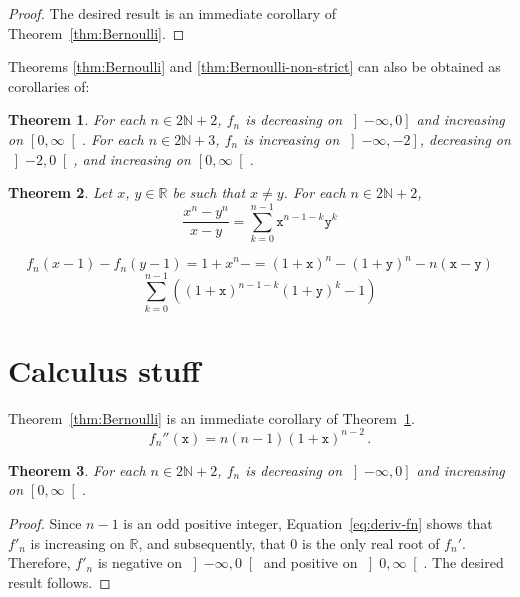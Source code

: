 \documentclass[12pt]{article}
\newcommand{\bR}{\mathbb{R}}
\newcommand{\bN}{\mathbb{N}}
\newcommand{\gtint}[1]{\left] #1, \infty \right[}
\newcommand{\geint}[1]{\left[ #1, \infty \right[}
\newcommand{\ltint}[1]{\left]- \infty, #1 \right[}
\newcommand{\leint}[1]{\left]- \infty, #1 \right]}
\newcommand{\ttx}{\mathtt{x}}
\newcommand{\tty}{\mathtt{y}}
\newtheorem{theorem}{Theorem}
\begin{document}
 \begin{proof}
   The desired result is an immediate corollary of Theorem~\ref{thm:Bernoulli}.
 \end{proof}

 Theorems \ref{thm:Bernoulli} and \ref{thm:Bernoulli-non-strict} can also be obtained as corollaries of:
 
  \begin{theorem} \label{thm:variation}
    For each $n \in 2 \bN + 2$,
    $f_n$ is
    decreasing on $\leint{0}$ and
    increasing on $\geint{0}$.
   For each $n \in 2 \bN + 3$, $f_n$ is
   increasing on $\leint{- 2}$,
   decreasing on $\left]- 2, 0 \right[$, and
   increasing on $\geint{0}$.
\end{theorem}

\begin{theorem}
  Let $x$, $y \in \bR$ be such that $x \ne y$.
   For each $n \in 2 \bN + 2$, 
   $$
  \frac{x^n - y^n}{x - y} = \sum_{k = 0}^{n - 1} \ttx^{n - 1 - k}\tty^k 
   $$
   
   $$
   f_n(x - 1) - f_n(y - 1) = {1 + x}^n - 
    = 
   {(1 + \ttx)}^n - {(1 + \tty)}^n - n (\ttx - \tty)
   $$
   $$
   \sum_{k = 0}^{n - 1} \left(  {(1 + \ttx)}^{n - 1 - k}{(1 + \tty)}^k - 1  \right)
   $$
 \end{theorem}

 

 
 \section{Calculus stuff}


Theorem~\ref{thm:Bernoulli} is an immediate corollary of Theorem~\ref{thm:variation}.
 $$
  f_n''(\ttx)  = n (n - 1) {(1 + \ttx)}^{n - 2} \,.
  $$


 \begin{theorem} \label{thm:variation-even}
   For each $n \in 2 \bN + 2$,
   $f_n$ is
   decreasing on $\leint{0}$ and
   increasing on $\geint{0}$.
 \end{theorem}

 \begin{proof}
   Since $n - 1$ is an odd positive integer,
   Equation~\eqref{eq:deriv-fn} shows that
   $f'_n$ is increasing on $\bR$,
   and subsequently, that
   $0$ is the only real root of $f_n'$.
   Therefore,
   $f'_n$ is negative on $\ltint{0}$
   and 
   positive on $\gtint{0}$.
   The desired result follows.
 \end{proof}
\end{document}
